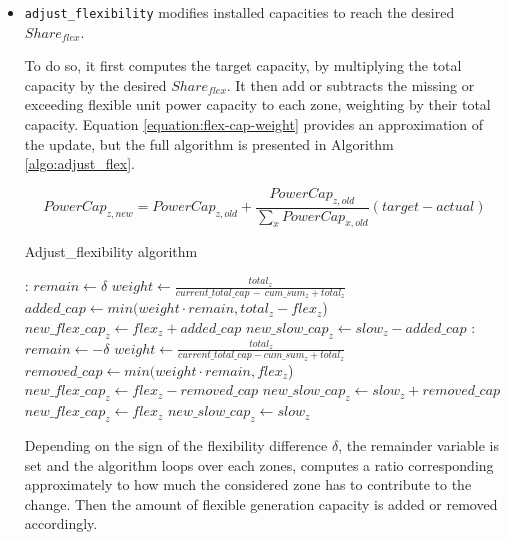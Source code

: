 \begin{itemize}
    \item \texttt{adjust\_flexibility} modifies installed capacities to reach the desired $Share_{flex}$.
    
    To do so, it first computes the target capacity, by multiplying the total capacity by the desired $Share_{flex}$. It then add or subtracts the missing or exceeding flexible unit power capacity to each zone, weighting by their total capacity. Equation \ref{equation:flex-cap-weight} provides an approximation of the update, but the full algorithm is presented in Algorithm \ref{algo:adjust_flex}.

    \begin{equation}
        PowerCap_{z,new} = PowerCap_{z,old} + \frac{PowerCap_{z,old}}{\sum_x PowerCap_{x,old}} (target-actual)
        \label{equation:flex-cap-weight}
    \end{equation}

    \begin{algorithm}[h]
        \caption{Adjust\_flexibility algorithm} \label{algo:adjust_flex}
        \begin{algorithmic}[1]
            : 
                \State $remain \gets \delta$
                \State $weight \gets \frac{total_{z}}{current\_total\_cap \, - \, cum\_sum_{z}+total_{z}}$
                \State $added\_cap \gets min (weight \cdot remain, total_{z} - flex_{z}$)
                \State $new\_flex\_cap_{z} \gets flex_{z} + added\_cap$
                \State $new\_slow\_cap_{z} \gets slow_{z} - added\_cap$
                \EndFor
            : 
                \State $remain \gets - \delta$
                \State $weight \gets \frac{total_{z}}{current\_total\_cap-cum\_sum_{z}+total_{z}}$
                \State $removed\_cap \gets min (weight \cdot remain, flex_{z}$)
                \State $new\_flex\_cap_{z} \gets flex_{z} - removed\_cap$
                \State $new\_slow\_cap_{z} \gets slow_{z} + removed\_cap$
                \EndFor
            \Else
            \State $new\_flex\_cap_{z} \gets flex_{z}$
            \State $new\_slow\_cap_{z} \gets slow_{z}$
            \EndIf
        \end{algorithmic}
    \end{algorithm}

    Depending on the sign of the flexibility difference $\delta$, the remainder variable is set and the algorithm loops over each zones, computes a ratio corresponding approximately to how much the considered zone has to contribute to the change. Then the amount of flexible generation capacity is added or removed accordingly.


\end{itemize}
